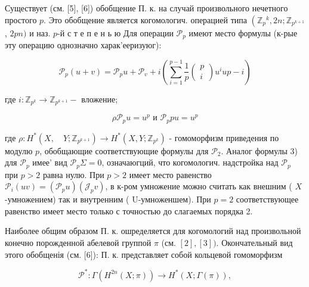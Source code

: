 \documentclass[10pt]{article}
\begin{document}
Существует (см. [5], [6]) обобщение П. к. на случай произвольного нечетного простого $p$. Это обобщение является когомологич. операцией типа $\left(\mathbb{Z}{ }_{p}{ }^{k}, 2 n ; \mathbb{Z}_{p^{k+1}}\right.$, $2 p n)$ и наз. $p$-й $с$ т е п е н ь ю Для операции $\mathscr{P}_{p}$ имеют место формулы (к-рые эту операцию однозначно харак'ееризуюг):



\[

\mathscr{P}_{p}(u+v)=\mathscr{P}_{p} u+\mathscr{P}_{v}+i\left(\sum_{i=1}^{p-1} \frac{1}{p}\left(\begin{array}{c}

p \\

i

\end{array}\right) u^{i} u p-i\right)

\]



где $i: \mathbb{Z}_{p^{k}} \rightarrow \mathbb{Z}_{p^{k+1}}-$ вложение;



\[

\rho \mathscr{P}_{p} u=u^{p} \text { и } \mathscr{P}_{p} p u=u^{p}

\]



где $\rho: H^{*}\left(X, \quad Y ; \mathbb{Z}_{p^{k+1}}\right) \rightarrow H^{*}\left(X, Y ; \mathbb{Z}_{p^{k}}\right)$ - гомоморфизм приведения по модулю $p$, обобщающие соответствующие формулы для $\mathscr{P}_{2}$. Аналог формулы 3) для $\mathscr{P}_{p}$ имее' вид $\mathscr{P}_{p} \Sigma=0$, означаюгций, что когомологич. надстройка над $\mathscr{P}_{p}$ при $p>2$ равна нулю. При $p>2$ имеет место равенство $\mathscr{P}_{i}(u v)=\left(\mathscr{P}_{p} u\right)\left(\mathscr{J}_{p} v\right)$, в к-ром умножение можно считать как внешним ( $X$-умножением) так и внутренним ( U-умноженшем). При $p=2$ соответствующее равенство имеет место только с точностью до слагаемых порядка 2.



Наиболее общим образом П. к. ошределяется для когомологий над произвольной конечно порожденной абелевой группой $\pi$ (см. $[2],[3])$. Окончательный вид этого обобщенія (см. [6]): П. к. представляет собой кольцевой гомоморфизм



\[

\mathscr{P}^{*}: \Gamma\left(H^{2 n}(X ; \pi)\right) \longrightarrow H^{*}(X ; \Gamma(\pi)),

\]
\end{document}

